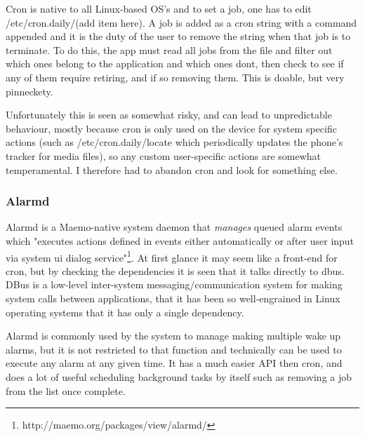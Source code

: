 Cron is native to all Linux-based OS's and to set a job, one has to edit /etc/cron.daily/(add item here).  A job is added as a cron string with a command appended and it is the duty of the user to remove the string when that job is to terminate. To do this, the app must read all jobs from the file and filter out which ones belong to the application and which ones dont, then check to see if any of them require retiring, and if so removing them. This is doable, but very pinneckety.

Unfortunately this is seen as somewhat risky, and can lead to unpredictable behaviour, mostly because cron is only used on the device for system specific actions (such as /etc/cron.daily/locate which periodically updates the phone's tracker for media files), so any custom user-specific actions are somewhat temperamental.  I therefore had to abandon cron and look for something else.

\subsubsection{Alarmd}
Alarmd is a Maemo-native system daemon that {\it manages} queued alarm events which "executes actions defined in events either automatically or after user input via system ui dialog service"\footnote{http://maemo.org/packages/view/alarmd/}. At first glance it may seem like a front-end for cron, but by checking the dependencies it is seen that it talks directly to dbus. DBus is a low-level inter-system messaging/communication system for making system calls between applications, that it has been so well-engrained in Linux operating systems that it has only a single dependency.

Alarmd is commonly used by the system to manage making multiple wake up alarms, but it is not restricted to that function and technically can be used to execute any alarm at any given time. It has a much easier API then cron, and does a lot of useful scheduling background tasks by itself such as removing a job from the list once complete. 

